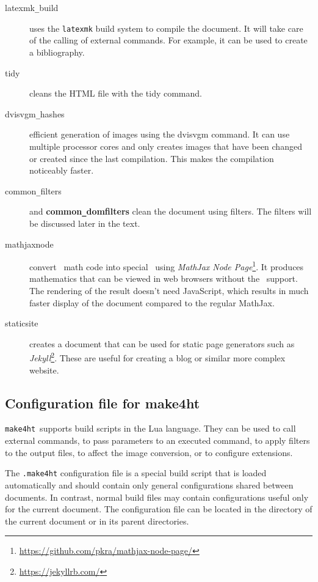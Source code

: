 \documentclass{ltugproc}
\newcommand\term[1]{\textit{#1}}
\newcommand\command[1]{\texttt{#1}}
\newcommand\makefourht{\command{make4ht}}
\newcommand\extension[1]{\texttt{.#1}}
\begin{document}
\begin{description}
  \item[latexmk\texttt{\_}build] uses the \command{latexmk} build system to compile the document. It will take care of the calling of external commands. For example, it can be used to create a bibliography.

  \item[tidy] cleans the HTML file with the tidy command.

  \item[dvisvgm\texttt{\_}hashes] efficient generation of images using the dvisvgm command. It can use multiple processor cores and only creates images that have been changed or created since the last compilation. This makes the compilation noticeably faster.  

  \item[common\texttt{\_}filters] and \textbf{common\texttt{\_}domfilters}
clean the document using filters. The filters will be discussed later in the  text.

\item[mathjaxnode] convert \MathML\ math code into special \HTML\ using
  \term{MathJax Node Page}\footnote{\url{https://github.com/pkra/mathjax-node-page/}}.
  It produces mathematics that can be viewed in web browsers without the 
  \MathML\ support. The rendering of the result doesn't need JavaScript, which results in much faster display of the document compared  to the regular MathJax.

\item[staticsite] creates a document that can be used for static page generators such as \term{Jekyll}\footnote{\url{https://jekyllrb.com/}}. These are useful for creating a blog or similar more complex website.
\end{description}


\subsection{Configuration file for make4ht}

\makefourht\ supports build scripts in the  Lua language. They can be used to
call external commands, to pass parameters to an executed command, to apply filters to
the output files, to affect the image conversion, or to configure extensions.

The \extension{make4ht} configuration file is a special build script that is loaded
automatically and should contain only general configurations shared between documents. In contrast,
normal build files may contain configurations useful only for the current document. The
configuration file can be located in the  directory of the current   document or in  its
parent directories. 
\end{document}

